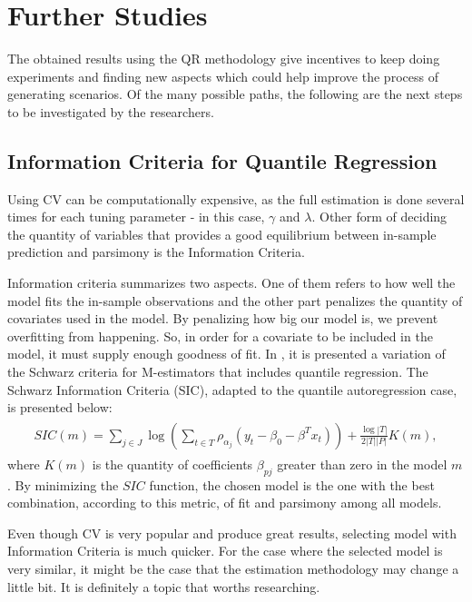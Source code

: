 \section{Further Studies}

The obtained results using the QR methodology give incentives to keep doing experiments and finding new aspects which could help improve the process of generating scenarios. Of the many possible paths, the following are the next steps to be investigated by the researchers. 

\subsection{Information Criteria for Quantile Regression}
Using CV can be computationally expensive, as the full estimation is done several times for each tuning parameter - in this case, $\gamma$ and $\lambda$. Other form of deciding the quantity of variables that provides a good equilibrium between in-sample prediction and parsimony is the Information Criteria.

Information criteria summarizes two aspects. One of them refers to how well the model fits the in-sample observations and the other part penalizes the quantity of covariates used in the model. By penalizing how big our model is, we prevent overfitting from happening. So, in order for a covariate to be included in the model, it must supply enough goodness of fit.
In \cite{machado1993robust}, it is presented a variation of the Schwarz criteria for M-estimators that includes quantile regression. The Schwarz Information Criteria (SIC), adapted to the quantile autoregression case, is presented below:
\begin{align} 
\begin{split}
SIC(m) = \sum_{j \in J} \log \left(\sum_{t \in T}\rho_{\alpha_j}(y_t - \beta_0 - \beta^T x_t) \right) +  \frac{\log|T|}{2|T||P|} K(m),\label{eq:SIC}
\end{split}					
\end{align}
where $K(m)$ is the quantity of coefficients $\beta_{pj}$ greater than zero in the model $m$.
By minimizing the $SIC$ function, the chosen model is the one with the best combination, according to this metric, of fit and parsimony among all models. 

Even though CV is very popular and produce great results, selecting model with Information Criteria is much quicker. For the case where the selected model is very similar, it might be the case that the estimation methodology may change a little bit. It is definitely a topic that worths researching.

